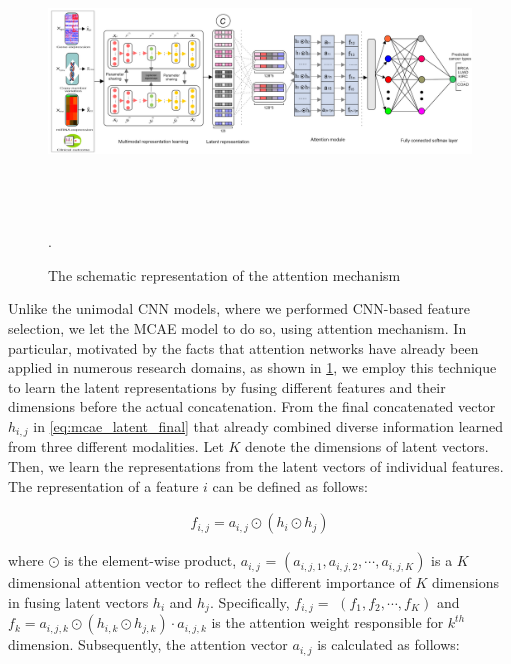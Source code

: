 \begin{figure}
	\centering
	\includegraphics[width=\textwidth,height=70mm]{images/attention.png}	\caption{The schematic representation of the attention mechanism}.	
    \vspace{-2mm}
	\label{fig:attention}
\end{figure}

\hspace*{3.5mm} Unlike the unimodal CNN models, where we performed CNN-based feature selection, we let the MCAE model to do so, using attention mechanism. In particular, motivated by the facts that attention networks have already been applied in numerous research domains, as shown in \cref{fig:attention}, we employ this technique to learn the latent representations by fusing different features and their dimensions before the actual concatenation. From the final concatenated vector $h_{i,j}$ in \cref{eq:mcae_latent_final} that already combined diverse information learned from three different modalities. Let $K$ denote the dimensions of latent vectors. Then, we learn the representations from the latent vectors of individual features. The representation of a feature $i$ can be defined as follows: 

\vspace{-6mm}
\begin{align}
    f_{i,j}=a_{i,j} \odot\left(h_{i} \odot h_{j}\right)
\end{align}
\vspace{-6mm}

\hspace*{3.5mm} where $\odot$ is the element-wise product, $a_{i,j}$ = $\left(a_{i,j,1}, a_{i,j,2}, \cdots, a_{i,j,K}\right)$ is a $K$ dimensional attention vector to reflect the different importance of $K$ dimensions in fusing latent vectors $h_{i}$ and $h_{j}$.  Specifically, $f_{i,j}=$ $\left(f_{1}, f_{2}, \cdots, f_{K}\right)$ and $f_{k}=a_{i,j,k} \odot\left(h_{i,k} \odot h_{j,k}\right) \cdot a_{i,j,k}$ is the attention weight responsible for $k^{th}$ dimension. Subsequently, the attention vector $a_{i,j}$ is calculated as follows: 
 
